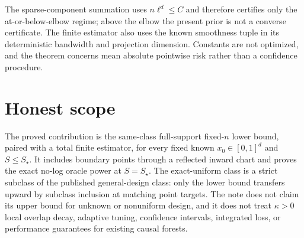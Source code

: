 \documentclass{article}
\begin{document}
The sparse-component summation uses \(n\ell^d\le C\) and therefore certifies only the at-or-below-elbow regime; above the elbow the present prior is not a converse certificate. The finite estimator also uses the known smoothness tuple in its deterministic bandwidth and projection dimension. Constants are not optimized, and the theorem concerns mean absolute pointwise risk rather than a confidence procedure.

\section{Honest scope}

The proved contribution is the same-class full-support fixed-\(n\) lower bound, paired with a total finite estimator, for every fixed known \(x_0\in[0,1]^d\) and \(S\le S_\star\). It includes boundary points through a reflected inward chart and proves the exact no-log oracle power at \(S=S_\star\). The exact-uniform class is a strict subclass of the published general-design class: only the lower bound transfers upward by subclass inclusion at matching point targets. The note does not claim its upper bound for unknown or nonuniform design, and it does not treat \(\kappa>0\) local overlap decay, adaptive tuning, confidence intervals, integrated loss, or performance guarantees for existing causal forests.
\end{document}
